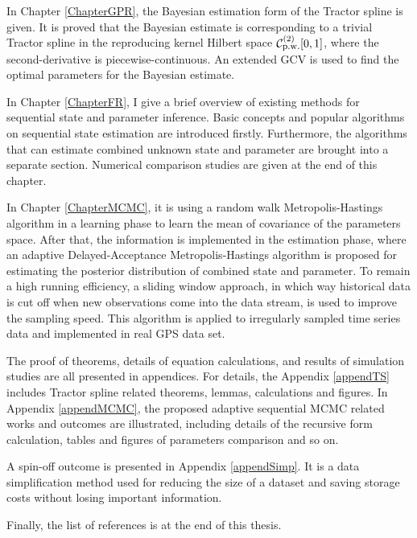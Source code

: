 In Chapter \ref{ChapterGPR}, the Bayesian estimation form of the Tractor spline is given. It is proved that the Bayesian estimate is corresponding to a trivial Tractor spline  in the reproducing kernel Hilbert space $\mathcal{C}_{\mbox{\footnotesize p.w.}}^{(2)}[0,1]$, where the second-derivative is piecewise-continuous.  An extended GCV is used to find the optimal parameters for the Bayesian estimate. 

In Chapter \ref{ChapterFR}, I give a brief overview of existing methods for sequential state and parameter inference. Basic concepts and popular algorithms on sequential state estimation are introduced firstly. Furthermore, the algorithms that can estimate combined unknown state and parameter are brought into a separate section. Numerical comparison studies are given at the end of this chapter. 

In Chapter \ref{ChapterMCMC}, it is using a random walk Metropolis-Hastings algorithm in a learning phase to learn the mean of covariance of the parameters space. After that, the information is implemented in the estimation phase, where an adaptive Delayed-Acceptance Metropolis-Hastings algorithm is proposed for estimating the posterior distribution of combined state and parameter. To remain a high running efficiency, a sliding window approach, in which way historical data is cut off when new observations come into the data stream, is used to improve the sampling speed. This algorithm is applied to irregularly sampled time series data and implemented in real GPS data set. 

The proof of theorems, details of equation calculations, and results of simulation studies are all presented in appendices. For details, the Appendix \ref{appendTS} includes Tractor spline related theorems, lemmas, calculations and figures. In Appendix \ref{appendMCMC}, the proposed adaptive sequential MCMC related works and outcomes are illustrated, including details of the recursive form calculation, tables and figures of parameters comparison and so on. 

A spin-off outcome is presented in Appendix \ref{appendSimp}. It is a data simplification method used for reducing the size of a dataset and saving storage costs without losing important information.

Finally, the list of references is at the end of this thesis.




